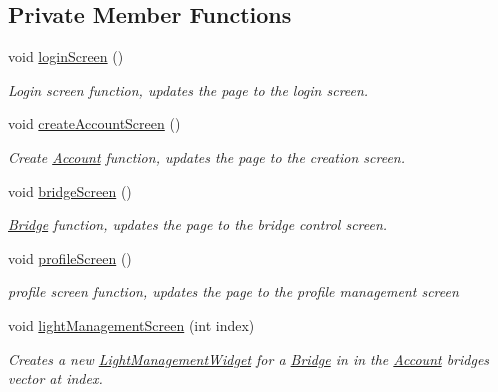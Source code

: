 \subsection*{Private Member Functions}
\begin{DoxyCompactItemize}
\item 
void \hyperlink{classWelcomeScreen_a720c47b7f03f1423139e9a0f6a1693ba}{login\+Screen} ()
\begin{DoxyCompactList}\small\item\em Login screen function, updates the page to the login screen. \end{DoxyCompactList}\item 
void \hyperlink{classWelcomeScreen_ab61fd209d95cc39b46a9bc0526304264}{create\+Account\+Screen} ()
\begin{DoxyCompactList}\small\item\em Create \hyperlink{classAccount}{Account} function, updates the page to the creation screen. \end{DoxyCompactList}\item 
void \hyperlink{classWelcomeScreen_af1587d0a89a8daf995dd851b24daa8b1}{bridge\+Screen} ()
\begin{DoxyCompactList}\small\item\em \hyperlink{classBridge}{Bridge} function, updates the page to the bridge control screen. \end{DoxyCompactList}\item 
void \hyperlink{classWelcomeScreen_a8c16248993785198885cb22a82113f99}{profile\+Screen} ()
\begin{DoxyCompactList}\small\item\em profile screen function, updates the page to the profile management screen \end{DoxyCompactList}\item 
void \hyperlink{classWelcomeScreen_aecd7b015439dfb5bdbe86ed9d8c229fc}{light\+Management\+Screen} (int index)
\begin{DoxyCompactList}\small\item\em Creates a new \hyperlink{classLightManagementWidget}{Light\+Management\+Widget} for a \hyperlink{classBridge}{Bridge} in in the \hyperlink{classAccount}{Account} bridges vector at index. \end{DoxyCompactList}\end{DoxyCompactItemize}
